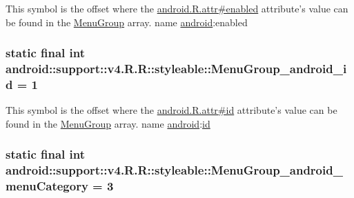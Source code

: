 This symbol is the offset where the \hyperlink{}{android.R.attr\#enabled} attribute's value can be found in the \hyperlink{classandroid_1_1support_1_1v4_1_1_r_1_1styleable_ba730c6d04433f7e2cb2ad1dd3b251a3}{MenuGroup} array.  name \hyperlink{namespaceandroid}{android}:enabled \hypertarget{classandroid_1_1support_1_1v4_1_1_r_1_1styleable_228a366c5643772debec90926b752e4b}{
\subsubsection[{MenuGroup\_\-android\_\-id}]{\setlength{\rightskip}{0pt plus 5cm}static final int android::support::v4.R.R::styleable::MenuGroup\_\-android\_\-id = 1}}
\label{classandroid_1_1support_1_1v4_1_1_r_1_1styleable_228a366c5643772debec90926b752e4b}


This symbol is the offset where the \hyperlink{}{android.R.attr\#id} attribute's value can be found in the \hyperlink{classandroid_1_1support_1_1v4_1_1_r_1_1styleable_ba730c6d04433f7e2cb2ad1dd3b251a3}{MenuGroup} array.  name \hyperlink{namespaceandroid}{android}:\hyperlink{classandroid_1_1support_1_1v4_1_1_r_1_1id}{id} \hypertarget{classandroid_1_1support_1_1v4_1_1_r_1_1styleable_b070cff86293dacf98e20c220a8e0af0}{
\subsubsection[{MenuGroup\_\-android\_\-menuCategory}]{\setlength{\rightskip}{0pt plus 5cm}static final int android::support::v4.R.R::styleable::MenuGroup\_\-android\_\-menuCategory = 3}}
\label{classandroid_1_1support_1_1v4_1_1_r_1_1styleable_b070cff86293dacf98e20c220a8e0af0}


